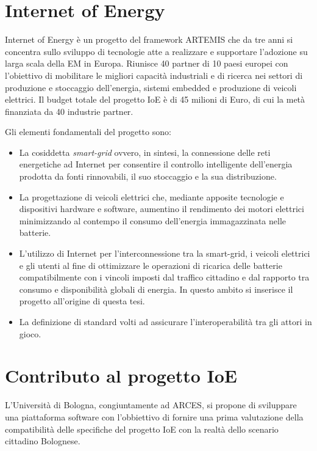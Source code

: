 \section{Internet of Energy}

Internet of Energy è un progetto del framework ARTEMIS che da tre anni si concentra sullo sviluppo di tecnologie atte a realizzare e supportare l'adozione su larga scala della EM in Europa. Riunisce 40 partner di 10 paesi europei con l'obiettivo di mobilitare le migliori capacità industriali e di ricerca nei settori di produzione e stoccaggio dell'energia, sistemi embedded e produzione di veicoli elettrici. Il budget totale del progetto IoE è di 45 milioni di Euro, di cui la metà finanziata da 40 industrie partner.

Gli elementi fondamentali del progetto sono:

\begin{itemize}
	\item La cosiddetta \emph{smart-grid} ovvero, in sintesi, la connessione delle reti energetiche ad Internet per consentire il controllo intelligente dell'energia prodotta da fonti rinnovabili, il suo stoccaggio e la sua distribuzione.
	\item La progettazione di veicoli elettrici che, mediante apposite tecnologie e dispositivi hardware e software, aumentino il rendimento dei motori elettrici minimizzando al contempo il consumo dell'energia immagazzinata nelle batterie.
	\item L'utilizzo di Internet per l'interconnessione tra la smart-grid, i veicoli elettrici e gli utenti al fine di ottimizzare le operazioni di ricarica delle batterie compatibilmente con i vincoli imposti dal traffico cittadino e dal rapporto tra consumo e disponibilità globali di energia. In questo ambito si inserisce il progetto all'origine di questa tesi.
	\item La definizione di standard volti ad assicurare l'interoperabilità tra gli attori in gioco.
\end{itemize}

\section{Contributo al progetto IoE}

L'Università di Bologna, congiuntamente ad ARCES, si propone di sviluppare una piattaforma software con l'obbiettivo di fornire una prima valutazione della compatibilità delle specifiche del progetto IoE con la realtà dello scenario cittadino Bolognese.

